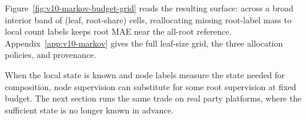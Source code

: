 Figure~\ref{fig:v10-markov-budget-grid} reads the resulting
surface: across a broad interior band of (leaf, root-share) cells,
reallocating missing root-label mass to local count labels keeps
root MAE near the all-root reference.
Appendix~\ref{app:v10-markov} gives the full leaf-size grid, the
three allocation policies, and provenance.

When the local state is known and node labels measure the state
needed for composition, node supervision can substitute for some
root supervision at fixed budget. The next section runs the same
trade on real party platforms, where the sufficient state is no
longer known in advance.
